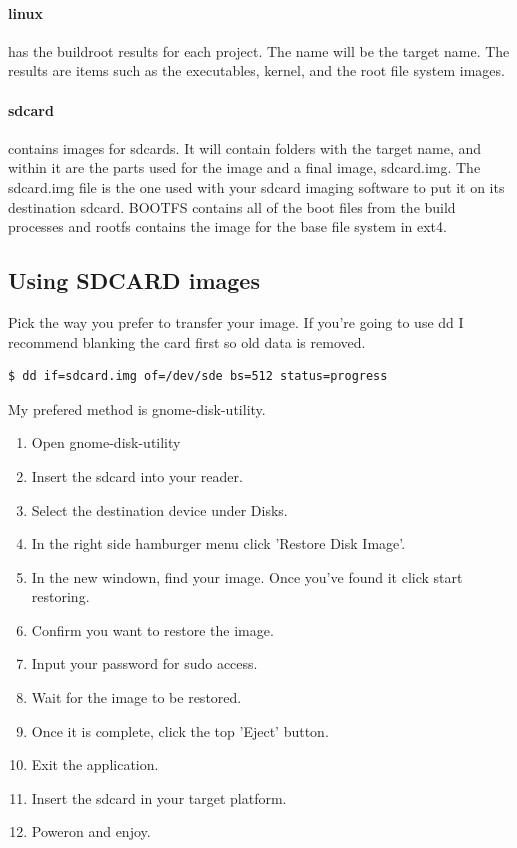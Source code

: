 \paragraph{linux} has the buildroot results for each project. The name will be the target name. The results are items such as the executables, kernel,
and the root file system images.

\paragraph{sdcard} contains images for sdcards. It will contain folders with the target name, and within it are the parts used for the image and a
final image, sdcard.img. The sdcard.img file is the one used with your sdcard imaging software to put it on its destination sdcard. BOOTFS contains
all of the boot files from the build processes and rootfs contains the image for the base file system in ext4.

\subsection{Using SDCARD images}
\par
Pick the way you prefer to transfer your image. If you're going to use dd I recommend blanking the card first so old data is removed.
\begin{lstlisting}[language=bash]
$ dd if=sdcard.img of=/dev/sde bs=512 status=progress
\end{lstlisting}
My prefered method is gnome-disk-utility.
\begin{enumerate}
\item Open gnome-disk-utility
\item Insert the sdcard into your reader.
\item Select the destination device under Disks.
\item In the right side hamburger menu click 'Restore Disk Image'.
\item In the new windown, find your image. Once you've found it click start restoring.
\item Confirm you want to restore the image.
\item Input your password for sudo access.
\item Wait for the image to be restored.
\item Once it is complete, click the top 'Eject' button.
\item Exit the application.
\item Insert the sdcard in your target platform.
\item Poweron and enjoy.
\end{enumerate}

